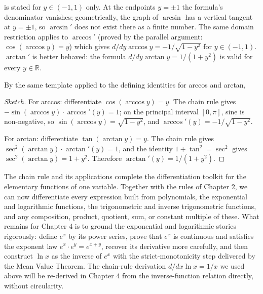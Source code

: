\begin{caution}
 is stated for \(y \in (-1, 1)\) only. At the endpoints \(y = \pm 1\) the formula's denominator vanishes; geometrically, the graph of \(\arcsin\) has a vertical tangent at \(y = \pm 1\), so \(\arcsin'\) does not exist there as a finite number. The same domain restriction applies to \(\arccos'\) (proved by the parallel argument: \(\cos(\arccos y) = y\)) which gives \(d/dy \arccos y = -1/\sqrt{1 - y^{2}}\) for \(y \in (-1, 1)\). \(\arctan'\) is better behaved: the formula \(d/dy \arctan y = 1/(1 + y^{2})\) is valid for every \(y \in \mathbb{R}\).
\end{caution}

\begin{corollary}\label{cor:arctrig-derivatives}
By the same template applied to the defining identities for arccos and arctan,
\end{corollary}

\begin{proof}[Sketch]
For arccos: differentiate \(\cos(\arccos y) = y\). The chain rule gives \(-\sin(\arccos y) \cdot \arccos'(y) = 1\); on the principal interval \([0, \pi]\), sine is non-negative, so \(\sin(\arccos y) = \sqrt{1 - y^{2}}\), and \(\arccos'(y) = -1/\sqrt{1 - y^{2}}\).

For arctan: differentiate \(\tan(\arctan y) = y\). The chain rule gives \(\sec^{2}(\arctan y) \cdot \arctan'(y) = 1\), and the identity \(1 + \tan^{2} = \sec^{2}\) gives \(\sec^{2}(\arctan y) = 1 + y^{2}\). Therefore \(\arctan'(y) = 1/(1 + y^{2})\).
\end{proof}

The chain rule and its applications complete the differentiation toolkit for the elementary functions of one variable. Together with the rules of Chapter 2, we can now differentiate every expression built from polynomials, the exponential and logarithmic functions, the trigonometric and inverse trigonometric functions, and any composition, product, quotient, sum, or constant multiple of these. What remains for Chapter 4 is to ground the exponential and logarithmic stories rigorously: define \(e^{x}\) by its power series, prove that \(e^{x}\) is continuous and satisfies the exponent law \(e^{x} \cdot e^{y} = e^{x + y}\), recover its derivative more carefully, and then construct \(\ln x\) as the inverse of \(e^{x}\) with the strict-monotonicity step delivered by the Mean Value Theorem. The chain-rule derivation \(d/dx \ln x = 1/x\) we used above will be re-derived in Chapter 4 from the inverse-function relation directly, without circularity.

